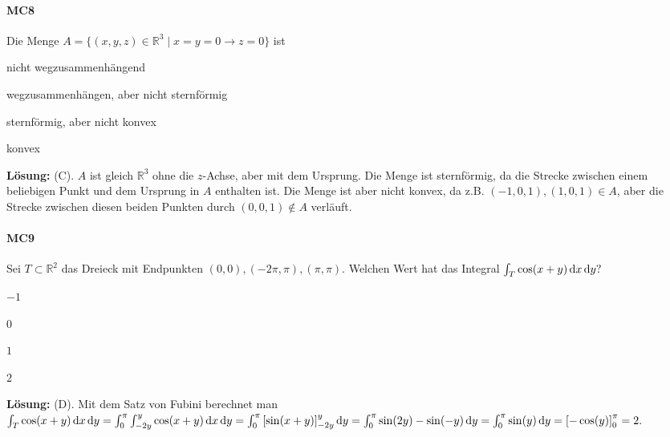 \documentclass[a4paper,10pt]{article}
\def\R{\mathbb{R}}
\begin{document}
{\paragraph{MC8} Die Menge \( A = \{ (x, y, z) \in \R^3 \mid x = y = 0 \rightarrow z = 0 \} \) ist
\begin{enumerate*}
    \item nicht wegzusammenhängend
    \item wegzusammenhängen, aber nicht sternförmig
    \item sternförmig, aber nicht konvex
    \item konvex
\end{enumerate*}
\textbf{Lösung:} (C). \( A \) ist gleich \( \R^3 \) ohne die \( z \)-Achse, aber mit dem Ursprung. Die Menge ist sternförmig, da die Strecke zwischen einem beliebigen Punkt und dem Ursprung in \( A \) enthalten ist. Die Menge ist aber nicht konvex, da z.B. \( (-1, 0, 1), (1, 0, 1) \in A \), aber die Strecke zwischen diesen beiden Punkten durch \( (0, 0, 1) \notin A \) verläuft.

\paragraph{MC9} Sei \( T \subset \R^2 \) das Dreieck mit Endpunkten \( (0, 0), (-2 \pi, \pi), (\pi, \pi) \). Welchen Wert hat das Integral
\(
    \int_T \cos(x + y) \odif{x, y} \text{?}
\)
\begin{enumerate*}
    \item \( - 1\)
    \item \( 0 \)
    \item \( 1 \)
    \item \( 2 \)
\end{enumerate*}
\textbf{Lösung:} (D). Mit dem Satz von Fubini berechnet man
\(
    \int_T \cos(x + y) \odif{x, y} = \int_0^\pi \int_{-2y}^y \cos(x + y) \odif{x, y} = \int_0^\pi \left[ \sin(x + y) \right]_{-2y}^y \odif{y} = \int_0^\pi \sin(2y) - \sin(-y) \odif{y} = \int_0^\pi \sin(y) \odif{y} = \left[ -\cos(y) \right]_0^\pi = 2 \text{.}
\)

}
\end{document}
